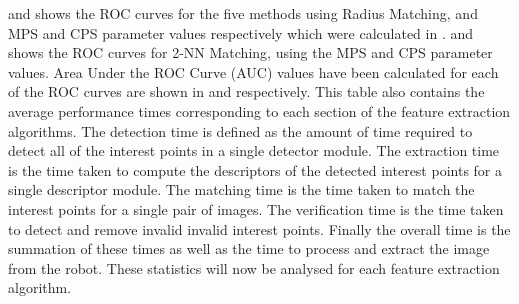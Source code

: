 \documentclass[11pt]{report}
\begin{document}
 and  shows the ROC curves for the five methods using Radius Matching, and MPS and CPS parameter values respectively which were calculated in .  and  shows the ROC curves for 2-NN Matching, using the MPS and CPS parameter values. Area Under the ROC Curve (AUC) values have been calculated for each of the ROC curves are shown in  and  respectively. This table also contains the average performance times corresponding to each section of the feature extraction algorithms. The detection time is defined as the amount of time required to detect all of the interest points in a single detector module. The extraction time is the time taken to compute the descriptors of the detected interest points for a single descriptor module. The matching time is the time taken to match the interest points for a single pair of images. The verification time is the time taken to detect and remove invalid invalid interest points. Finally the overall time is the summation of these times as well as the time to process and extract the image from the robot. These statistics will now be analysed for each feature extraction algorithm. \\
\end{document}
